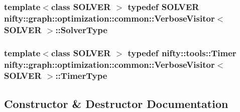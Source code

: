 \subsubsection[{Solver\+Type}]{\setlength{\rightskip}{0pt plus 5cm}template$<$class S\+O\+L\+V\+E\+R $>$ typedef S\+O\+L\+V\+E\+R {\bf nifty\+::graph\+::optimization\+::common\+::\+Verbose\+Visitor}$<$ S\+O\+L\+V\+E\+R $>$\+::{\bf Solver\+Type}}\label{classnifty_1_1graph_1_1optimization_1_1common_1_1VerboseVisitor_a5aa8c805242bf435548e2367674092d3}
\hypertarget{classnifty_1_1graph_1_1optimization_1_1common_1_1VerboseVisitor_a2b974614fdd9abcb04d4b479d6c1ce00}{}
\subsubsection[{Timer\+Type}]{\setlength{\rightskip}{0pt plus 5cm}template$<$class S\+O\+L\+V\+E\+R $>$ typedef {\bf nifty\+::tools\+::\+Timer} {\bf nifty\+::graph\+::optimization\+::common\+::\+Verbose\+Visitor}$<$ S\+O\+L\+V\+E\+R $>$\+::{\bf Timer\+Type}}\label{classnifty_1_1graph_1_1optimization_1_1common_1_1VerboseVisitor_a2b974614fdd9abcb04d4b479d6c1ce00}


\subsection{Constructor \& Destructor Documentation}
\hypertarget{classnifty_1_1graph_1_1optimization_1_1common_1_1VerboseVisitor_a94ba835044985c41231d19b3ff53bf01}{}

